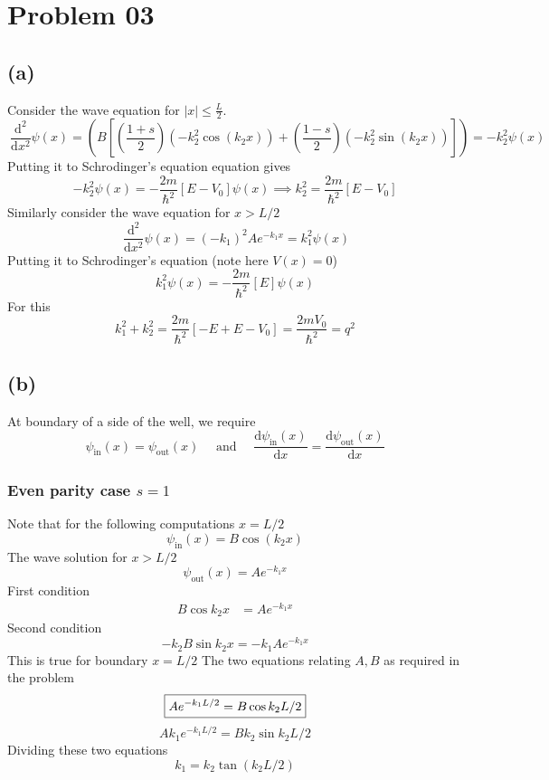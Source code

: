 \documentclass[letterpaper]{article}
\newcommand{\hb}{\hbar}
\begin{document}
\section*{Problem 03} 
\subsection*{(a)}

Consider the wave equation for $|x| \le \frac{L}{2}$. 
\[
\ \frac{\mathrm{d} ^2}{\mathrm{d} x^2} \psi(x) = 
\left(
B 
\left[
	\left(\frac{1+s}{2}\right) \left(- k_2^2 \cos(k_2 x)\right)
	+
	\left(\frac{1-s}{2}\right) \left(- k_2^2 \sin(k_2 x)\right)
\right]
\right) = 
- k_2^2 \psi(x)
\] 
Putting it to Schrodinger's equation equation gives 
\[
	-k_2^2 \psi(x) = - \frac{2m}{\hb^2} [E - V_0] \psi(x) \implies k_2^2 = \frac{2m}{\hb^2} [E - V_0]
\] 
Similarly consider the wave equation for $x > L / 2$ 
\[
\ \frac{\mathrm{d} ^2}{\mathrm{d} x^2 } \psi(x) = (-k_1)^2 A e^{- k_1 x} = 
k_1^2 \psi(x)
\] 
Putting it to Schrodinger's equation (note here $V(x) = 0$)
\[
	k_1^2 \psi(x) = - \frac{2m}{\hb^2} [E] \psi(x)
\]
For this 
\[
	k_1^2 + k_2^2 = \frac{2m}{\hb ^2 } [- E + E - V_0] = \frac{2mV_0 }{\hb ^2}  = q^2
\] 

\subsection*{(b)} 
At boundary of a side of the well, we require 
\[
\psi_\text{in} (x)= \psi_\text{out} (x) \quad \text{ and } \quad \frac{\mathrm{d} \psi_\text{in} (x)}{\mathrm{d} x} = \frac{\mathrm{d} \psi_\text{out} (x)}{\mathrm{d} x}
\] 
\subsubsection*{Even parity case $s = 1$ } 
Note that for the following computations $x = L / 2$\[
\psi_\text{in}(x) = B \cos (k_2 x) 
\] 
The wave solution for $x > L / 2$
\[
\psi_\text{out} (x) = A e^{-k_1 x}
\]
First condition
\begin{align*}
	B \cos k_2 x &= A e^{- k_1 x} 
\end{align*}
Second condition 
\[
-k_2 B \sin k_2 x = -k_1 A e^{ - k_1 x}
\]
This is true for boundary $x = L / 2$
The two equations relating $A,B$ as required in the problem 
\[ \boxed{
	A e^{- k_1 L / 2} = B \cos k_2 L / 2 \\ 
} \]  \[ \boxed{
A k_1 e^{-k_1 L /2 } =  B k_2 \sin k_2 L / 2
}\] 
Dividing these two equations
\[
k_1 = k_2 \tan \left(k_2 L / 2\right)
\] 
\end{document}
